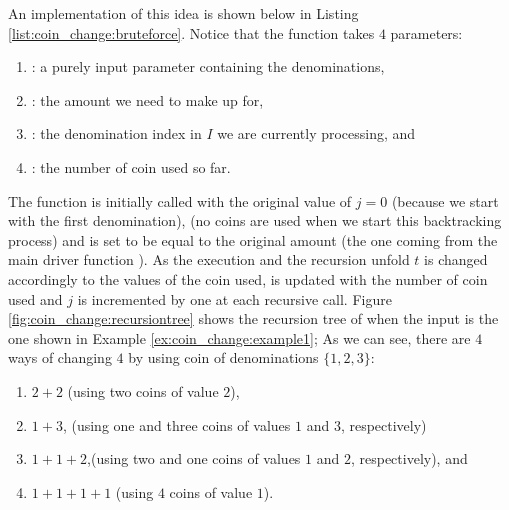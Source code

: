 An implementation of this idea is shown below in Listing \ref{list:coin_change:bruteforce}.
Notice that the function  takes $4$ parameters:
\begin{enumerate}
	\item {}: a purely input parameter containing the denominations,
	\item {}: the amount we need to make up for,
	\item {}: the denomination index in $I$ we are currently processing, and
	\item {}: the number of coin used so far.
\end{enumerate}
The function is initially called with the original value of $j=0$ (because we start with the first denomination),  (no coins are used when we start this backtracking process) and  is set to be equal to the original amount (the one coming from the main driver function ).
As the execution and the recursion unfold $t$ is changed accordingly to the values of the coin used, 
 is updated with the number of coin used and $j$ is incremented by one at each recursive call. Figure \ref{fig:coin_change:recursiontree} shows the recursion tree of  when the input is the one shown in Example \ref{ex:coin_change:example1}; As we can see, there are $4$ ways of changing $4$ by using coin of denominations $\{1,2,3\}$:
\begin{enumerate}
	\item $2+2$ (using two coins of value $2$),
	\item $1+3$, (using one and three coins of values $1$ and $3$, respectively)
	\item $1+1+2$,(using two and one coins of values $1$ and $2$, respectively), and
	\item $1+1+1+1$ (using $4$ coins of value $1$).
\end{enumerate}

